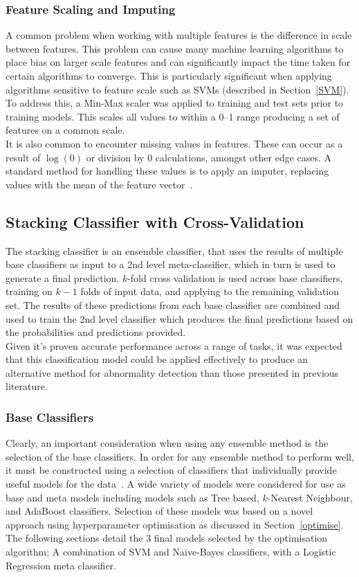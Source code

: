 \documentclass[titlepage, 12pt]{scrartcl} \usepackage{enumitem}
\begin{document}
\subsubsection{Feature Scaling and Imputing}
A common problem when working with multiple features is the difference in scale
between features. This problem can cause many machine learning algorithms to place
bias on larger scale features and can significantly impact the time taken for
certain algorithms to converge. This is particularly significant when applying
algorithms sensitive to feature scale such as SVMs (described in
Section~\ref{SVM}). To address this, a Min-Max scaler was applied
to training and test sets prior to training models. This scales all values to within a
0--1 range producing a set of features on a common scale.\\
It is also common to encounter missing values in features. These can occur as a
result of $\log(0)$ or division by 0 calculations, amongst other edge cases. A
standard method for handling these values is to apply an imputer, replacing
values with the mean of the feature vector~\parencite{VanderPlas2017}.

\subsection{Stacking Classifier with Cross-Validation}\label{class}
The stacking classifier is an ensemble classifier, that uses the results of
multiple base classifiers as input to a 2nd level meta-classifier, which in
turn is used to generate a final prediction. $k$-fold cross validation is used
across base classifiers, training on $k-1$ folds of input data, and applying
to the remaining validation set. The results of these predictions from each
base classifier are combined and used to train the 2nd level classifier which
produces the final predictions based on the probabilities and predictions
provided.\\
Given it's proven accurate performance across a range of tasks, it was
expected that this classification model could be applied effectively to produce
an alternative method for abnormality detection than those presented in
previous literature.

\subsubsection{Base Classifiers}
Clearly, an important consideration when using any ensemble method is the
selection of the base classifiers. In order for any ensemble method to perform
well, it must be constructed using a selection of classifiers that individually
provide useful models for the data~\parencite[p.484]{Tobergte2013a}.   A wide
variety of models were considered for use as base and meta models including
models such as Tree based, $k$-Nearest Neighbour, and AdaBoost classifiers.
Selection of these models was based on a novel approach using hyperparameter
optimisation as discussed in Section~\ref{optimise}. The following sections
detail the 3 final models selected by the optimisation algorithm; A combination
of SVM and Naive-Bayes classifiers, with a Logistic Regression meta classifier.
\end{document}
